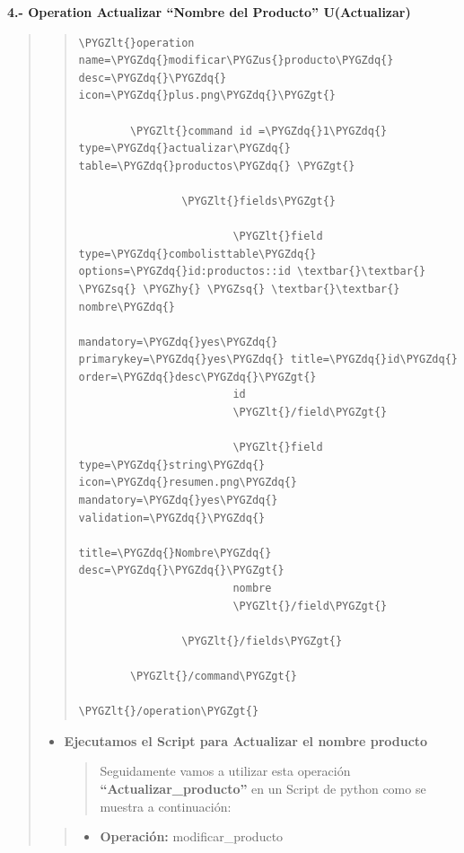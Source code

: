 \documentclass[letterpaper,11pt,spanish]{sphinxmanual}
\def\PYGZus{\char`\_}
\def\PYGZlt{\char`\<}
\def\PYGZgt{\char`\>}
\def\PYGZhy{\char`\-}
\def\PYGZsq{\char`\'}
\def\PYGZdq{\char`\"}
\begin{document}
\textbf{4.- Operation Actualizar ``Nombre del Producto'' U(Actualizar)}
\begin{quote}
\begin{quote}

\begin{Verbatim}[commandchars=\\\{\}]
\PYGZlt{}operation  name=\PYGZdq{}modificar\PYGZus{}producto\PYGZdq{}  desc=\PYGZdq{}\PYGZdq{} icon=\PYGZdq{}plus.png\PYGZdq{}\PYGZgt{}

        \PYGZlt{}command id =\PYGZdq{}1\PYGZdq{} type=\PYGZdq{}actualizar\PYGZdq{} table=\PYGZdq{}productos\PYGZdq{} \PYGZgt{}

                \PYGZlt{}fields\PYGZgt{}

                        \PYGZlt{}field type=\PYGZdq{}combolisttable\PYGZdq{} options=\PYGZdq{}id:productos::id \textbar{}\textbar{} \PYGZsq{} \PYGZhy{} \PYGZsq{} \textbar{}\textbar{} nombre\PYGZdq{}
                                                mandatory=\PYGZdq{}yes\PYGZdq{} primarykey=\PYGZdq{}yes\PYGZdq{} title=\PYGZdq{}id\PYGZdq{} order=\PYGZdq{}desc\PYGZdq{}\PYGZgt{}
                        id
                        \PYGZlt{}/field\PYGZgt{}

                        \PYGZlt{}field type=\PYGZdq{}string\PYGZdq{} icon=\PYGZdq{}resumen.png\PYGZdq{} mandatory=\PYGZdq{}yes\PYGZdq{} validation=\PYGZdq{}\PYGZdq{}
                                                                title=\PYGZdq{}Nombre\PYGZdq{} desc=\PYGZdq{}\PYGZdq{}\PYGZgt{}
                        nombre
                        \PYGZlt{}/field\PYGZgt{}

                \PYGZlt{}/fields\PYGZgt{}

        \PYGZlt{}/command\PYGZgt{}

\PYGZlt{}/operation\PYGZgt{}
\end{Verbatim}
\end{quote}
\begin{itemize}
\item {} 
\textbf{Ejecutamos el Script para Actualizar el nombre producto}
\begin{quote}

Seguidamente vamos a utilizar esta operación \textbf{``Actualizar\_producto''} en un Script de python como se muestra a continuación:
\end{quote}

\end{itemize}
\begin{quote}
\begin{itemize}
\item {} 
\textbf{Operación:} modificar\_producto


\end{itemize}
\end{quote}
\end{quote}
\end{document}
